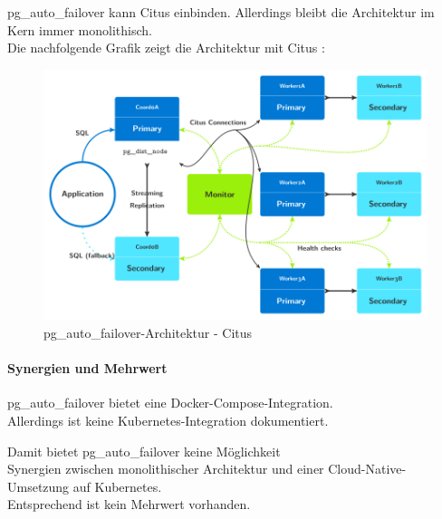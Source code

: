 \begin{flushleft}
    pg\_auto\_failover kann Citus einbinden.
    Allerdings bleibt die Architektur im Kern immer monolithisch.\\
    Die nachfolgende Grafik zeigt die Architektur mit Citus \cite{3FVHLIFE}:
    \begin{figure}[H]
        \centering
        \includegraphics[width=0.75\linewidth]{source/implementation/evaluation/postgresql_ha_solutions/pg_auto_failover/pg_auto-failover_arch-citus}
        \caption{pg\_auto\_failover-Architektur - Citus}
        \label{fig:pg_auto-failover_arch-citus}
    \end{figure}
\end{flushleft}
\begin{flushleft}
    \paragraph{Synergien und Mehrwert}
    pg\_auto\_failover bietet eine Docker-Compose-Integration.\\
    Allerdings ist keine Kubernetes-Integration dokumentiert.
\end{flushleft}
\begin{flushleft}
    Damit bietet pg\_auto\_failover keine Möglichkeit\\
    Synergien zwischen monolithischer Architektur und einer Cloud-Native-Umsetzung auf Kubernetes.\\
    Entsprechend ist kein Mehrwert vorhanden.
\end{flushleft}